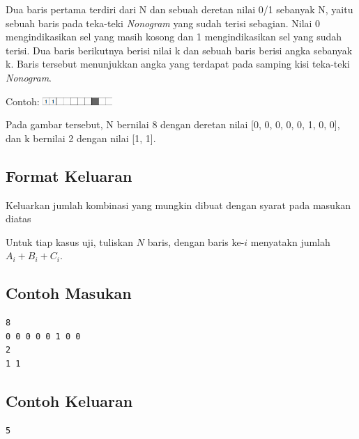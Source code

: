 \documentclass{article}
\begin{document}
Dua baris pertama terdiri dari N dan sebuah deretan nilai 0/1 sebanyak N, yaitu sebuah baris pada teka-teki \textit{Nonogram} yang sudah terisi sebagian.
Nilai 0 mengindikasikan sel yang masih kosong dan 1 mengindikasikan sel yang sudah terisi.
Dua baris berikutnya berisi nilai k dan sebuah baris berisi angka sebanyak k.
Baris tersebut menunjukkan angka yang terdapat pada samping kisi teka-teki \textit{Nonogram}.

Contoh:
\includegraphics[width=100px]{Homogram-Row}

Pada gambar tersebut, N bernilai 8 dengan deretan nilai [0, 0, 0, 0, 0, 1, 0, 0], dan k bernilai 2 dengan nilai [1, 1].

\subsection*{Format Keluaran}

Keluarkan jumlah kombinasi yang mungkin dibuat dengan syarat pada masukan diatas

Untuk tiap kasus uji, tuliskan $N$ baris, dengan baris ke-$i$ menyatakn jumlah $A_i + B_i + C_i$.
\\

\begin{multicols}{2}
\subsection*{Contoh Masukan}
\begin{lstlisting}
8
0 0 0 0 0 1 0 0
2
1 1
\end{lstlisting}
\columnbreak
\subsection*{Contoh Keluaran}
\begin{lstlisting}
5
\end{lstlisting}
\vfill
\null
\end{multicols}

\pagebreak
\end{document}
